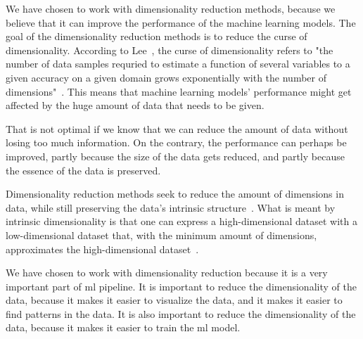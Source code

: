 
\cite{dimensionality-reduction-comparative-review} 
\cite{dimensionality-reduction-reddy} 
\cite{dimensionality-reduction-cheng} 
\cite{dimensionality-reduction-svm-jain}





We have chosen to work with dimensionality reduction methods, because we believe that it can improve the performance of the machine learning models. 
The goal of the dimensionality reduction methods is to reduce the curse of dimensionality. According to Lee~\cite{nonlinear-dim-red-chapter-one}, the curse of dimensionality refers to "the number of data samples requried to estimate a function of several variables to a given accuracy on a given domain grows exponentially with the number of dimensions"~\cite{nonlinear-dim-red-chapter-one}. This means that machine learning models' performance might get affected by the huge amount of data that needs to be given.

That is not optimal if we know that we can reduce the amount of data without losing too much information. On the contrary, the performance can perhaps be improved, partly because the size of the data gets reduced, and partly because the essence of the data is preserved. 

Dimensionality reduction methods seek to reduce the amount of dimensions in data, while still preserving the data's intrinsic structure~\cite{nonlinear-dim-red-chapter-one}. What is meant by intrinsic dimensionality is that one can express a high-dimensional dataset with a low-dimensional dataset that, with the minimum amount of dimensions, approximates the high-dimensional dataset~\cite{dimensionality-reduction-comparative-review, nonlinear-dim-red-chapter-three}. 

We have chosen to work with dimensionality reduction because it is a very important part of \gls{ml} pipeline. It is important to reduce the dimensionality of the data, because it makes it easier to visualize the data, and it makes it easier to find patterns in the data. It is also important to reduce the dimensionality of the data, because it makes it easier to train the \gls{ml} model. 















